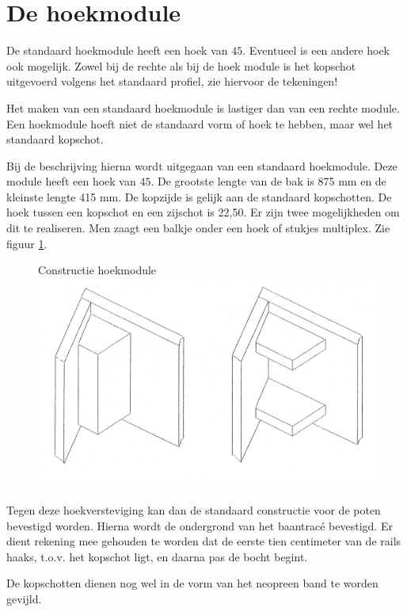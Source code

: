 \documentclass[12pt,a4paper]{report}
\newcommand*{\trace}{trac\'{e} }
\begin{document}
\section{De hoekmodule}
De standaard hoekmodule heeft een hoek van $45$\textdegree. Eventueel is een andere hoek ook mogelijk.
Zowel bij de rechte als bij de hoek module is het kopschot uitgevoerd volgens het standaard profiel, zie hiervoor de tekeningen!

Het maken van een standaard hoekmodule is lastiger dan van een rechte module. Een hoekmodule hoeft niet de standaard vorm of hoek te hebben, maar wel het standaard kopschot.

Bij de beschrijving hierna wordt uitgegaan van een standaard hoekmodule. Deze module heeft een hoek van $45$\textdegree. De grootste lengte van de bak is 875 mm en de kleinste lengte 415 mm. De kopzijde is gelijk aan de standaard kopschotten.
De hoek tussen een kopschot en een zijschot is 22,50. Er zijn twee mogelijkheden om dit te realiseren. Men zaagt een balkje onder een hoek of stukjes multiplex. Zie figuur \ref{figuur4}.

\begin{figure}[!ht]
  \captionbox
  {Constructie hoekmodule\label{figuur4}}
  {\includegraphics[scale=0.2]{images/rcu_figuur4}}
\end{figure}

Tegen deze hoekversteviging kan dan de standaard constructie voor de poten bevestigd worden. Hierna wordt de ondergrond van het baan\trace bevestigd. Er dient rekening mee gehouden te worden dat de eerste tien centimeter van de rails haaks, t.o.v. het kopschot ligt, en daarna pas de bocht begint. 

De kopschotten dienen nog wel in de vorm van het neopreen band te worden gevijld. 
\end{document}
